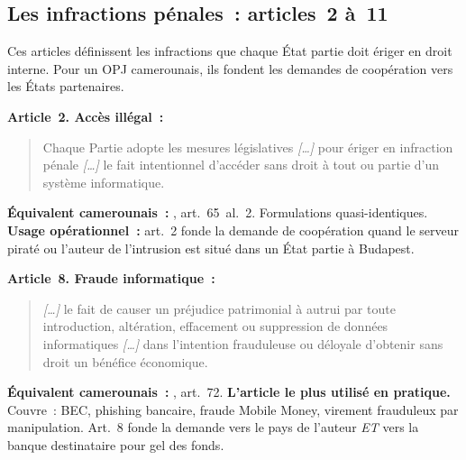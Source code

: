 \subsection{Les infractions pénales~: articles~2 à~11}

Ces articles définissent les infractions que chaque État partie doit
ériger en droit interne. Pour un OPJ camerounais, ils fondent les
demandes de coopération vers les États partenaires.

\begin{boxjuris}
\textbf{Article~2. Accès illégal~:}
\begin{quote}
Chaque Partie adopte les mesures législatives \textit{[\ldots]} pour
ériger en infraction pénale \textit{[\ldots]} le fait intentionnel
d'accéder sans droit à tout ou partie d'un système informatique.
\end{quote}
\textbf{Équivalent camerounais~:} , art.~65~al.~2.
Formulations quasi-identiques.\\
\textbf{Usage opérationnel~:} art.~2 fonde la demande de coopération
quand le serveur piraté ou l'auteur de l'intrusion est situé dans un
État partie à Budapest.
\end{boxjuris}

\begin{boxjuris}
\textbf{Article~8. Fraude informatique~:}
\begin{quote}
\textit{[\ldots]} le fait de causer un préjudice patrimonial à autrui
par toute introduction, altération, effacement ou suppression de données
informatiques \textit{[\ldots]} dans l'intention frauduleuse ou déloyale
d'obtenir sans droit un bénéfice économique.
\end{quote}
\textbf{Équivalent camerounais~:} , art.~72.
\textbf{L'article le plus utilisé en pratique.}\\
Couvre~: BEC, phishing bancaire, fraude Mobile Money, virement
frauduleux par manipulation. Art.~8 fonde la demande vers le pays de
l'auteur \emph{ET} vers la banque destinataire pour gel des fonds.
\end{boxjuris}

